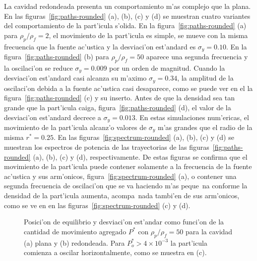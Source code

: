 La cavidad redondeada presenta un comportamiento m'as complejo que la plana. 
En las figuras~\ref{fig:paths-rounded} (a), (b), (c) y (d) se muestran cuatro variantes
del comportamiento de la part'icula s'olida. En la figura~\ref{fig:paths-rounded} (a) para 
$\rho_p/\rho_f = 2$, el movimiento de la part'icula es simple, se mueve con la misma
frecuencia que la fuente ac'ustica y la desviaci'on est'andard es $\sigma_y=0.10$. En 
la figura~\ref{fig:paths-rounded} (b)  para $\rho_p/\rho_f = 50$ aparece una segunda frecuencia
y la oscilaci'on se reduce $\sigma_y=0.009$ por un orden de magnitud. Cuando la desviaci'on
est'andard casi alcanza su m'aximo $\sigma_y = 0.34$, la amplitud de la oscilaci'on debida 
a la fuente ac'ustica casi desaparece, como se puede ver en el la figura~\ref{fig:paths-rounded} (c) 
y su inserto. Antes de que la densidad sea tan grande que la part'icula caiga, figura~\ref{fig:paths-rounded} (d),
el valor de la desviaci'on est'andard decrece a $\sigma_y=0.013$. En estas simulaciones num'ericas,
el movimiento de la part'icula alcanz'o valores de $\sigma_y$ m'as grandes que el radio de la misma $r^\ast = 0.25$.
En las figuras~\ref{fig:spectrum-rounded} (a), (b), (c) y (d) se muestran los espectros de
potencia de las trayectorias de las figuras~\ref{fig:paths-rounded} (a), (b), (c) y (d), respectivamente.
De estas figuras se confirma que el movimiento de la part'icula puede contener solamente a la 
frecuencia de la fuente ac'ustica y sus arm'onicos, figura~\ref{fig:spectrum-rounded} (a), o
contener una segunda frecuencia de oscilaci'on que se va haciendo m'as peque~na conforme la
densidad de la part'icula aumenta, acompa~nada tambi'en de sus arm'onicos, como se ve en 
en las figuras~\ref{fig:spectrum-rounded} (c) y (d).










\begin{figure}



\caption{\label{fig:barrido-momento}
Posici'on de equilibrio y desviaci'on est'andar como funci'on de la cantidad de movimiento
agregado  $P^\ast$ con 
$\rho_p/\rho_f=50$ para la cavidad  (a) plana  y (b) redondeada. Para  
$P_o^\ast>4\times 10^{-3}$ la part'icula comienza a oscilar horizontalmente, como se muestra en (c).
}
\end{figure}

